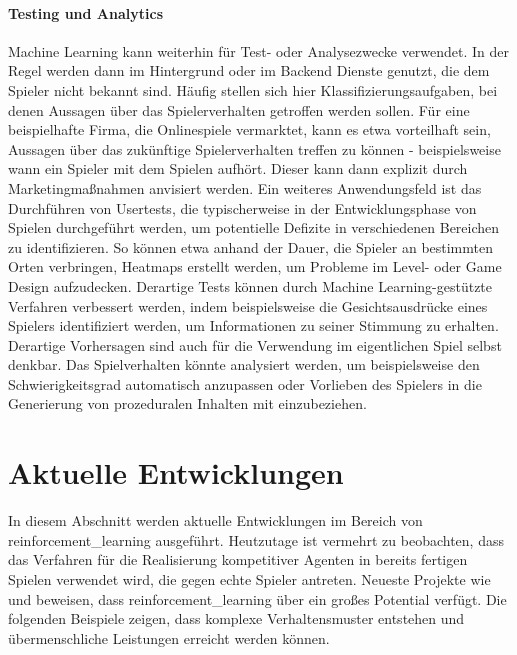\paragraph{Testing und Analytics}
Machine Learning kann weiterhin für Test- oder Analysezwecke verwendet. In der Regel werden dann im Hintergrund oder im Backend Dienste genutzt, die dem Spieler nicht bekannt sind. Häufig stellen sich hier Klassifizierungsaufgaben, bei denen Aussagen über das Spielerverhalten getroffen werden sollen. Für eine beispielhafte Firma, die Onlinespiele vermarktet, kann es etwa vorteilhaft sein, Aussagen über das zukünftige Spielerverhalten treffen zu können - beispielsweise wann ein Spieler mit dem Spielen aufhört. Dieser kann dann explizit durch Marketingmaßnahmen anvisiert werden.
Ein weiteres Anwendungsfeld ist das Durchführen von Usertests, die typischerweise in der Entwicklungsphase von Spielen durchgeführt werden, um potentielle Defizite in verschiedenen Bereichen zu identifizieren. So können etwa anhand der Dauer, die Spieler an  bestimmten Orten verbringen, Heatmaps erstellt werden, um Probleme im Level- oder Game Design aufzudecken. Derartige Tests können durch Machine Learning-gestützte Verfahren verbessert werden, indem beispielsweise die Gesichtsausdrücke eines Spielers identifiziert werden, um Informationen zu seiner Stimmung zu erhalten.
Derartige Vorhersagen sind auch für die Verwendung im eigentlichen Spiel selbst denkbar. Das Spielverhalten könnte analysiert werden, um beispielsweise den Schwierigkeitsgrad automatisch anzupassen oder Vorlieben des Spielers in die Generierung von prozeduralen Inhalten mit einzubeziehen.




\section{Aktuelle Entwicklungen}\label{aktuelle_entwicklungen_rl}
In diesem Abschnitt werden aktuelle Entwicklungen im Bereich von \ac{reinforcement_learning} ausgeführt. Heutzutage ist vermehrt zu beobachten, dass das Verfahren für die Realisierung kompetitiver Agenten in bereits fertigen Spielen verwendet wird, die gegen echte Spieler antreten. Neueste Projekte wie  \cite{google_deep_mind} und  \cite{openai_five_paper} beweisen, dass \ac{reinforcement_learning} über ein großes Potential verfügt. Die folgenden Beispiele zeigen, dass komplexe Verhaltensmuster entstehen und übermenschliche Leistungen erreicht werden können.


